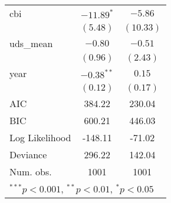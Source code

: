 \begin{tabular}{l c c }
cbi                             & $-11.89^{*}$  & $-5.86$     \\
                                & $(5.48)$      & $(10.33)$   \\
uds\_mean                       & $-0.80$       & $-0.51$     \\
                                & $(0.96)$      & $(2.43)$    \\
year                            & $-0.38^{**}$  & $0.15$      \\
                                & $(0.12)$      & $(0.17)$    \\
\hline
AIC                             & 384.22        & 230.04      \\
BIC                             & 600.21        & 446.03      \\
Log Likelihood                  & -148.11       & -71.02      \\
Deviance                        & 296.22        & 142.04      \\
Num. obs.                       & 1001          & 1001        \\
\hline
\multicolumn{3}{l}{\scriptsize{$^{***}p<0.001$, $^{**}p<0.01$, $^*p<0.05$}}
\end{tabular}
